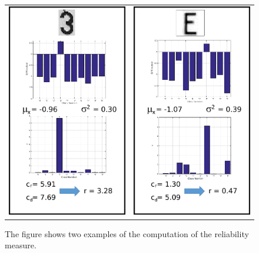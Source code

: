 \documentclass{ipol}
\begin{document}
\begin{figure}[!htbp]
	\begin{center}
		\begin{tabular}{cc}
			\includegraphics[width=.45\linewidth]{reliability_analysis_3.pdf} & 
			\includegraphics[width=.45\linewidth]{reliability_analysis_E.pdf} \\
		\end{tabular}
\caption{The figure shows two examples of the computation of the reliability measure.}
\label{fig:reliabilityExamples}
\end{center}
\end{figure}
\end{document}
